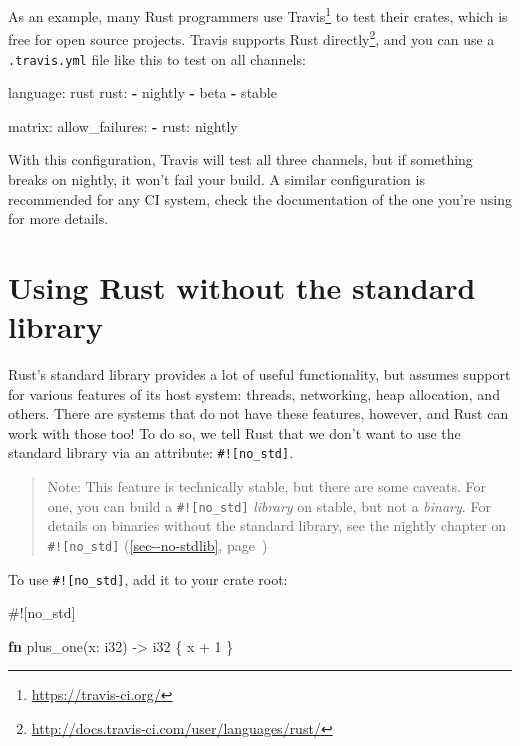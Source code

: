 \documentclass[a4paper,]{book}
\renewcommand*{\hypertarget}[3][\ar]{%
  \def\ar{#2}%
  \label{#1}%
  #3}
\renewcommand*{\hyperlink}[2]{%
 #2 (\autoref{#1}, page~\pageref{#1})}
\newenvironment{Shaded}{\begin{snugshade}}{\end{snugshade}}
\newcommand{\KeywordTok}[1]{\textcolor[rgb]{0.13,0.29,0.53}{\textbf{{#1}}}}
\newcommand{\DataTypeTok}[1]{\textcolor[rgb]{0.13,0.29,0.53}{{#1}}}
\newcommand{\DecValTok}[1]{\textcolor[rgb]{0.00,0.00,0.81}{{#1}}}
\newcommand{\FunctionTok}[1]{\textcolor[rgb]{0.00,0.00,0.00}{{#1}}}
\newcommand{\AttributeTok}[1]{\textcolor[rgb]{0.77,0.63,0.00}{{#1}}}
\newcommand{\NormalTok}[1]{{#1}}
\renewcommand{\href}[2]{#2\footnote{\url{#1}}}
\begin{document}
As an example, many Rust programmers use
\href{https://travis-ci.org/}{Travis} to test their crates, which is
free for open source projects. Travis
\href{http://docs.travis-ci.com/user/languages/rust/}{supports Rust
directly}, and you can use a \texttt{.travis.yml} file like this to test
on all channels:

\begin{Shaded}
\begin{Highlighting}[]
\FunctionTok{language:} \NormalTok{rust}
\FunctionTok{rust:}
  \KeywordTok{-} \NormalTok{nightly}
  \KeywordTok{-} \NormalTok{beta}
  \KeywordTok{-} \NormalTok{stable}

\FunctionTok{matrix:}
  \FunctionTok{allow_failures:}
    \KeywordTok{-} \FunctionTok{rust:} \NormalTok{nightly}
\end{Highlighting}
\end{Shaded}

With this configuration, Travis will test all three channels, but if
something breaks on nightly, it won't fail your build. A similar
configuration is recommended for any CI system, check the documentation
of the one you're using for more details.

\hypertarget{sec--using-rust-without-the-standard-library}{\section{Using
Rust without the standard
library}\label{sec--using-rust-without-the-standard-library}}

Rust's standard library provides a lot of useful functionality, but
assumes support for various features of its host system: threads,
networking, heap allocation, and others. There are systems that do not
have these features, however, and Rust can work with those too! To do
so, we tell Rust that we don't want to use the standard library via an
attribute: \texttt{\#!{[}no\_std{]}}.

\begin{quote}
Note: This feature is technically stable, but there are some caveats.
For one, you can build a \texttt{\#!{[}no\_std{]}} \emph{library} on
stable, but not a \emph{binary}. For details on binaries without the
standard library, see \protect\hyperlink{sec--no-stdlib}{the nightly
chapter on \texttt{\#!{[}no\_std{]}}}
\end{quote}

To use \texttt{\#!{[}no\_std{]}}, add it to your crate root:

\begin{Shaded}
\begin{Highlighting}[]
\AttributeTok{#![}\NormalTok{no_std}\AttributeTok{]}

\KeywordTok{fn} \NormalTok{plus_one(x: }\DataTypeTok{i32}\NormalTok{) -> }\DataTypeTok{i32} \NormalTok{\{}
    \NormalTok{x + }\DecValTok{1}
\NormalTok{\}}
\end{Highlighting}
\end{Shaded}
\end{document}
